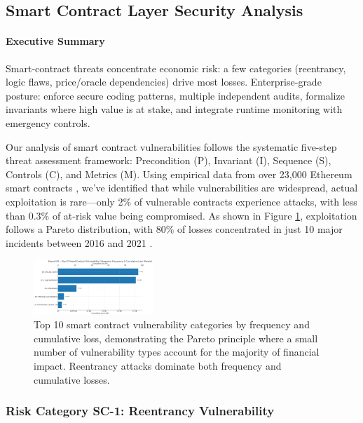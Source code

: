 \subsection{Smart Contract Layer Security Analysis}
\label{sec:results_smart_contract}

\paragraph{Executive Summary}
Smart-contract threats concentrate economic risk: a few categories (reentrancy, logic flaws, price/oracle dependencies) drive most losses. Enterprise-grade posture: enforce secure coding patterns, multiple independent audits, formalize invariants where high value is at stake, and integrate runtime monitoring with emergency controls.

Our analysis of smart contract vulnerabilities follows the systematic five-step threat assessment framework: Precondition (P), Invariant (I), Sequence (S), Controls (C), and Metrics (M). Using empirical data from over 23,000 Ethereum smart contracts \cite{perez2021analysis}, we've identified that while vulnerabilities are widespread, actual exploitation is rare—only 2\% of vulnerable contracts experience attacks, with less than 0.3\% of at-risk value being compromised. As shown in Figure \ref{fig:smart_contract_pareto}, exploitation follows a Pareto distribution, with 80\% of losses concentrated in just 10 major incidents between 2016 and 2021 \cite{zhou2023sok}.

\begin{figure}[H]
\centering
\includegraphics[width=0.4\textwidth]{../figure/fig8.png}
\caption{Top 10 smart contract vulnerability categories by frequency and cumulative loss, demonstrating the Pareto principle where a small number of vulnerability types account for the majority of financial impact. Reentrancy attacks dominate both frequency and cumulative losses.}
\label{fig:smart_contract_pareto}
\end{figure}

\subsubsection{Risk Category SC-1: Reentrancy Vulnerability}

